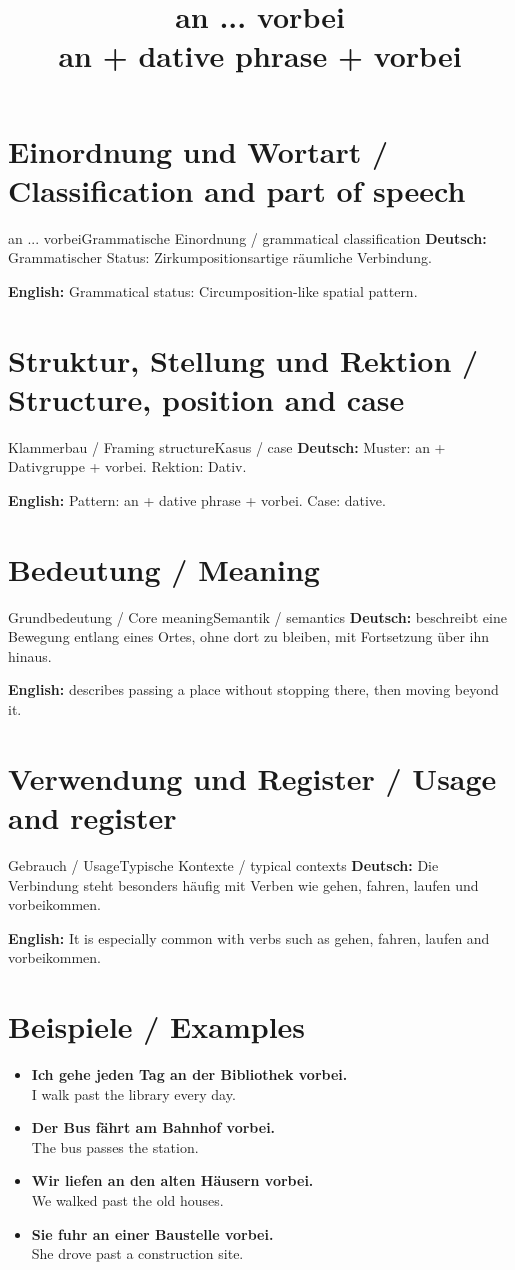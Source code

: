 \documentclass[a4paper,11pt]{article}
\title{an ... vorbei\\ \large an + dative phrase + vorbei}
\date{}
\newcommand{\GermanText}[1]{\textbf{Deutsch: }#1\par}
\newcommand{\EnglishText}[1]{{\small\color{SoftGray}\textbf{English: }#1\par}}
\newcommand{\ExampleItem}[2]{\item \textbf{#1}\\{\small\color{SoftGray}#2}}
\begin{document}
\maketitle
\tableofcontents
\newpage
\section{Einordnung und Wortart / Classification and part of speech}
\begin{grammarentry}{an ... vorbei}{Grammatische Einordnung / grammatical classification}
\GermanText{Grammatischer Status: Zirkumpositionsartige räumliche Verbindung.}
\EnglishText{Grammatical status: Circumposition-like spatial pattern.}
\end{grammarentry}
\section{Struktur, Stellung und Rektion / Structure, position and case}
\begin{grammarentry}{Klammerbau / Framing structure}{Kasus / case}
\GermanText{Muster: an + Dativgruppe + vorbei. Rektion: Dativ.}
\EnglishText{Pattern: an + dative phrase + vorbei. Case: dative.}
\end{grammarentry}
\section{Bedeutung / Meaning}
\begin{grammarentry}{Grundbedeutung / Core meaning}{Semantik / semantics}
\GermanText{beschreibt eine Bewegung entlang eines Ortes, ohne dort zu bleiben, mit Fortsetzung über ihn hinaus.}
\EnglishText{describes passing a place without stopping there, then moving beyond it.}
\end{grammarentry}
\section{Verwendung und Register / Usage and register}
\begin{grammarentry}{Gebrauch / Usage}{Typische Kontexte / typical contexts}
\GermanText{Die Verbindung steht besonders häufig mit Verben wie gehen, fahren, laufen und vorbeikommen.}
\EnglishText{It is especially common with verbs such as gehen, fahren, laufen and vorbeikommen.}
\end{grammarentry}
\section{Beispiele / Examples}
\begin{exbox}
\begin{itemize}
\ExampleItem{Ich gehe jeden Tag an der Bibliothek vorbei.}{I walk past the library every day.}
\ExampleItem{Der Bus fährt am Bahnhof vorbei.}{The bus passes the station.}
\ExampleItem{Wir liefen an den alten Häusern vorbei.}{We walked past the old houses.}
\ExampleItem{Sie fuhr an einer Baustelle vorbei.}{She drove past a construction site.}
\end{itemize}
\end{exbox}
\end{document}
